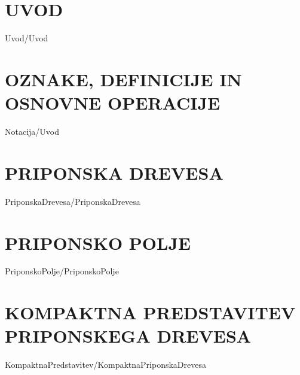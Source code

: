\documentclass[12pt,a4paper,titlepage,openany,twoside]{report}
\begin{document}
% 
% 

\chapter{UVOD}\label{sec:uvod}
\thispagestyle{fancy} %

{Uvod/Uvod}

\chapter{OZNAKE, DEFINICIJE IN OSNOVNE OPERACIJE}\label{sec:Notacija}
\thispagestyle{fancy} 
{Notacija/Uvod}

\chapter{PRIPONSKA DREVESA}\label{sec:priponska_drevesa}
\thispagestyle{fancy} 
{PriponskaDrevesa/PriponskaDrevesa}

\chapter{PRIPONSKO POLJE}\label{sec:SA}
\thispagestyle{fancy} 
{PriponskoPolje/PriponskoPolje}

\chapter{KOMPAKTNA PREDSTAVITEV PRIPONSKEGA DREVESA}\label{sec:Kompaktna}
\thispagestyle{fancy} 


{KompaktnaPredstavitev/KompaktnaPriponskaDrevesa}
\end{document}
